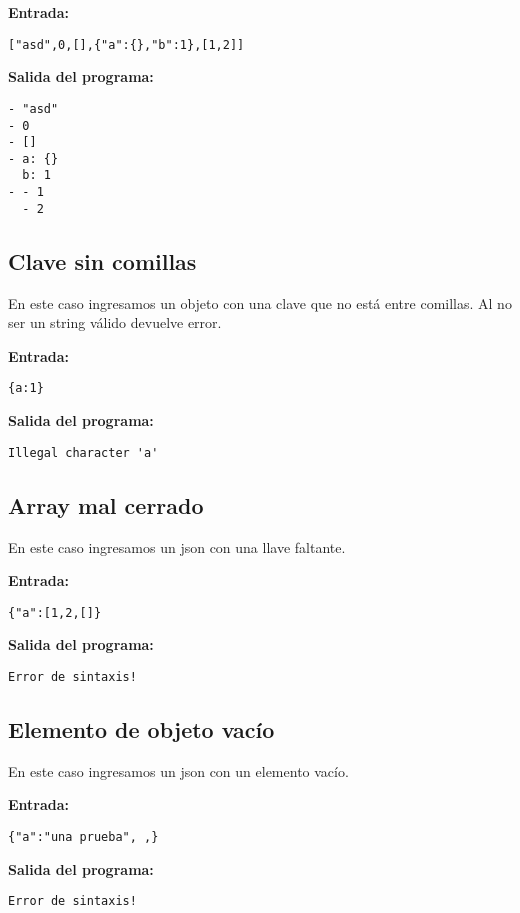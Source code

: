 \textbf{Entrada:}
\begin{verbatim}
["asd",0,[],{"a":{},"b":1},[1,2]]
\end{verbatim}

\textbf{Salida del programa:}
\begin{verbatim}
- "asd"
- 0
- []
- a: {}
  b: 1
- - 1
  - 2
\end{verbatim}

\subsection{Clave sin comillas}
En este caso ingresamos un objeto con una clave que no está entre comillas. Al no ser un string válido devuelve error.

\textbf{Entrada:}
\begin{verbatim}
{a:1}
\end{verbatim}

\textbf{Salida del programa:}
\begin{verbatim}
Illegal character 'a'
\end{verbatim}

\subsection{Array mal cerrado}
En este caso ingresamos un json con una llave faltante.

\textbf{Entrada:}
\begin{verbatim}
{"a":[1,2,[]}
\end{verbatim}

\textbf{Salida del programa:}
\begin{verbatim}
Error de sintaxis!
\end{verbatim}

\subsection{Elemento de objeto vacío}
En este caso ingresamos un json con un elemento vacío.

\textbf{Entrada:}
\begin{verbatim}
{"a":"una prueba", ,}
\end{verbatim}

\textbf{Salida del programa:}
\begin{verbatim}
Error de sintaxis!
\end{verbatim}
